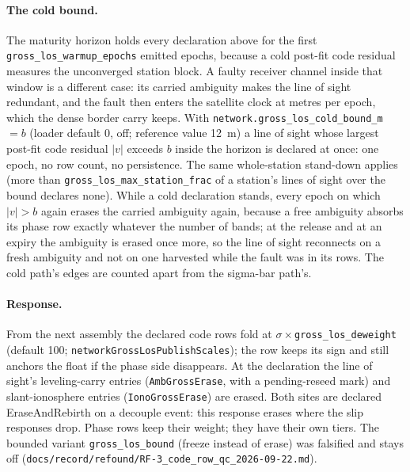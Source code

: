 \documentclass[main.tex]{subfiles}
\begin{document}
\paragraph{The cold bound.}
The maturity horizon holds every declaration above for the first
\texttt{gross\_los\_warmup\_epochs} emitted epochs, because a cold post-fit
code residual measures the unconverged station block. A faulty receiver
channel inside that window is a different case: its carried ambiguity makes
the line of sight redundant, and the fault then enters the satellite clock
at metres per epoch, which the dense border carry keeps. With
\texttt{network.gross\_los\_cold\_bound\_m} $= b$ (loader default 0, off;
reference value \SI{12}{\metre}) a line of sight whose largest post-fit code
residual $|v|$ exceeds $b$ inside the horizon is declared at once: one
epoch, no row count, no persistence. The same whole-station stand-down
applies (more than \texttt{gross\_los\_max\_station\_frac} of a station's
lines of sight over the bound declares none). While a cold declaration
stands, every epoch on which $|v| > b$ again erases the carried ambiguity
again, because a free ambiguity absorbs its phase row exactly whatever the
number of bands; at the release and at an expiry the ambiguity is erased
once more, so the line of sight reconnects on a fresh ambiguity and not on
one harvested while the fault was in its rows. The cold path's edges are
counted apart from the sigma-bar path's.

\paragraph{Response.}
From the next assembly the declared code rows fold at
$\sigma\times$\texttt{gross\_los\_deweight} (default 100;
\texttt{networkGrossLosPublishScales}); the row keeps its sign and still
anchors the float if the phase side disappears. At the declaration the
line of sight's leveling-carry entries (\texttt{AmbGrossErase}, with a
pending-reseed mark) and slant-ionosphere entries
(\texttt{IonoGrossErase}) are erased. Both sites are declared
EraseAndRebirth on a decouple event: this response erases where the slip
responses drop. Phase rows keep their weight; they have their own tiers.
The bounded variant \texttt{gross\_los\_bound} (freeze instead of erase)
was falsified and stays off
(\texttt{docs/record/refound/RF-3\_code\_row\_qc\_2026-09-22.md}).
\end{document}
